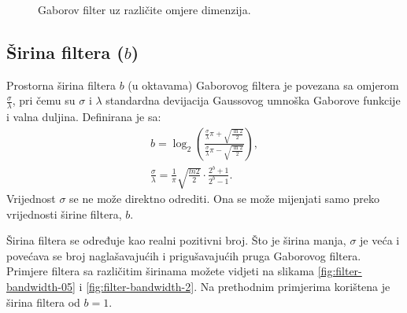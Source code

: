 \documentclass{article}
\begin{document}
\begin{figure}[htb]
  \centering
  \hspace{50pt}
  \caption{Gaborov filter uz različite omjere dimenzija.}
  \label{fig:filter-ratios}
\end{figure}

\subsection{Širina filtera ($b$)}
Prostorna širina filtera $b$ (u oktavama) Gaborovog filtera je povezana sa
omjerom $\frac{\sigma}{\lambda}$, pri čemu su $\sigma$ i $\lambda$ standardna
devijacija Gaussovog umnoška Gaborove funkcije i valna duljina. Definirana je
sa:
\begin{eqnarray}
b = \log_2{\left (  \frac{\frac{\sigma}{\lambda}\pi + \sqrt{\frac{\ln2}{2}}}
{\frac{\sigma}{\lambda}\pi - \sqrt{\frac{\ln2}{2}}} \right )}, \\
\frac{\sigma}{\lambda} =
\frac{1}{\pi}\sqrt{\frac{ln2}{2}}\cdot\frac{2^b+1}{2^b-1}.
\end{eqnarray}
Vrijednost $\sigma$ se ne može direktno odrediti. Ona se može mijenjati samo
preko vrijednosti širine filtera, $b$.

Širina filtera se određuje kao realni pozitivni broj. Što je širina manja,
$\sigma$ je veća i povećava se broj naglašavajućih i prigušavajućih pruga
Gaborovog filtera.~ Primjere filtera sa
različitim širinama možete vidjeti na slikama \ref{fig:filter-bandwidth-05} i
\ref{fig:filter-bandwidth-2}. Na prethodnim primjerima korištena je širina
filtera od $b = 1$.
\end{document}
